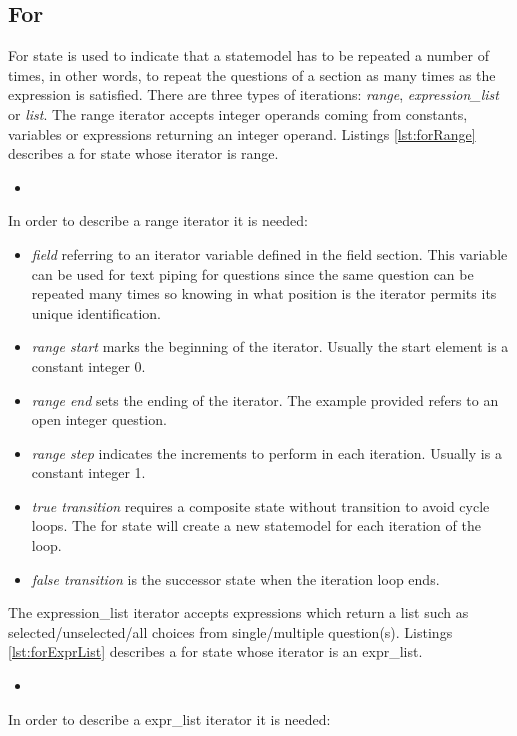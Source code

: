 \documentclass{article}
\newcommand{\insertcode}[3]{\begin{itemize}\item[]\end{itemize}} %
\begin{document}
	\subsection{For}
	For state is used to indicate that a statemodel has to be repeated a number of times, in other words, to repeat the questions of a section as many times as the expression is satisfied. There are three types of iterations: \emph{range}, \emph{expression\_list} or \emph{list}. The range iterator accepts integer operands coming from constants, variables or expressions returning an integer operand. Listings \ref{lst:forRange} describes a for state whose iterator is range.
\insertcode{"scripts/for_range.xml"}{Range for state example}{lst:forRange}
In order to describe a range iterator it is needed:
\begin{itemize}
	\item \emph{field} referring to an iterator variable defined in the field section. This variable can be used for text piping for questions since the same question can be repeated many times so knowing in what position is the iterator permits its unique identification.
	\item \emph{range start} marks the beginning of the iterator. Usually the start element is a constant integer 0.
	\item \emph{range end} sets the ending of the iterator. The example provided refers to an open integer question.
	\item \emph{range step} indicates the increments to perform in each iteration. Usually is a constant integer 1.
	\item \emph{true transition} requires a composite state without transition to avoid cycle loops. The for state will create a new 
statemodel for each iteration of the loop.
	\item \emph{false transition} is the successor state when the iteration loop ends.
\end{itemize}
The expression\_list iterator accepts expressions which return a list such as selected/unselected/all choices from single/multiple question(s). Listings \ref{lst:forExprList} describes a for state whose iterator is an expr\_list.
\insertcode{"scripts/for_expr_list.xml"}{Expression\_list for state example}{lst:forExprList}
In order to describe a expr\_list iterator it is needed:
\end{document}
